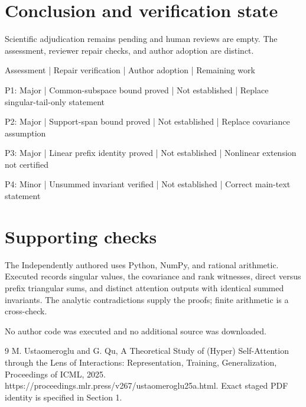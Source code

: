 \documentclass[10pt]{article}
\begin{document}
\section*{Conclusion and verification state}
Scientific adjudication remains pending and human reviews are empty. The assessment, reviewer repair checks, and author adoption are distinct.\par
Assessment | Repair verification | Author adoption | Remaining work\par
P1: Major | Common-subspace bound proved | Not established | Replace singular-tail-only statement\par
P2: Major | Support-span bound proved | Not established | Replace covariance assumption\par
P3: Major | Linear prefix identity proved | Not established | Nonlinear extension not certified\par
P4: Minor | Unsummed invariant verified | Not established | Correct main-text statement\par
\section*{Supporting checks}
The Independently authored uses Python, NumPy, and rational arithmetic. Executed records singular values, the covariance and rank witnesses, direct versus prefix triangular sums, and distinct attention outputs with identical summed invariants. The analytic contradictions supply the proofs; finite arithmetic is a cross-check.\par
No author code was executed and no additional source was downloaded.\par
9 M. Ustaomeroglu and G. Qu, A Theoretical Study of (Hyper) Self-Attention through the Lens of Interactions: Representation, Training, Generalization, Proceedings of ICML, 2025. https://proceedings.mlr.press/v267/ustaomeroglu25a.html. Exact staged PDF identity is specified in Section 1.\par
\end{document}
